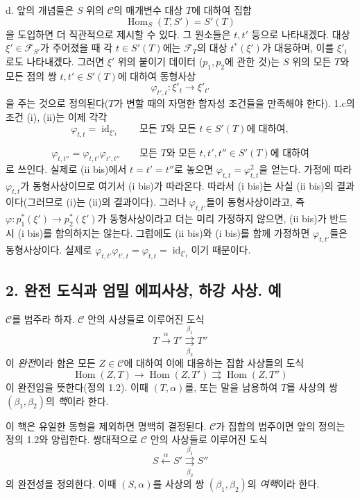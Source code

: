 \medskip\noindent
d. 앞의 개념들은 $S$ 위의 $\mathcal C$의 매개변수 대상 $T$에 대하여
집합
\[
  \operatorname{Hom}_S(T,S')=S'(T)
\]
을 도입하면 더 직관적으로 제시할 수 있다. 그 원소들은 $t,t'$ 등으로
나타내겠다. 대상 $\xi'\in\mathcal F_{S'}$가 주어졌을 때 각
$t\in S'(T)$에는 $\mathcal F_T$의 대상 $t^*(\xi')$가 대응하며, 이를
$\xi'_t$로도 나타내겠다. 그러면 $\xi'$ 위의 붙이기 데이터
($p_1,p_2$에 관한 것)는 $S$ 위의 모든 $T$와 모든 점의 쌍
$t,t'\in S'(T)$에 대하여 동형사상
\[
  \varphi_{t',t}:\xi'_t\longrightarrow\xi'_{t'}
\]
을 주는 것으로 정의된다($T$가 변할 때의 자명한 함자성 조건들을
만족해야 한다). 1.c의 조건 (i), (ii)는 이제 각각
\[
  \tag{i bis}
  \varphi_{t,t}=\operatorname{id}_{\xi'_t}
  \qquad\text{모든 $T$와 모든 $t\in S'(T)$에 대하여},
\]

\[
  \tag{ii bis}
  \varphi_{t,t''}=\varphi_{t,t'}\varphi_{t',t''}
  \qquad\text{모든 $T$와 모든 $t,t',t''\in S'(T)$에 대하여}
\]
로 쓰인다. 실제로 (ii bis)에서 $t=t'=t''$로 놓으면
$\varphi_{t,t}=\varphi_{t,t}^2$을 얻는다. 가정에 따라
$\varphi_{t,t}$가 동형사상이므로 여기서 (i bis)가 따라온다. 따라서
(i bis)는 사실 (ii bis)의 결과이다(그러므로 (i)는 (ii)의 결과이다).
그러나 $\varphi_{t,t'}$들이 동형사상이라고, 즉
$\varphi:p_1^*(\xi')\longrightarrow p_2^*(\xi')$가 동형사상이라고 더는
미리 가정하지 않으면, (ii bis)가 반드시 (i bis)를 함의하지는 않는다.
그럼에도 (ii bis)와 (i bis)를 함께 가정하면 $\varphi_{t,t'}$들은
동형사상이다. 실제로
$\varphi_{t,t'}\varphi_{t',t}=\varphi_{t,t}
=\operatorname{id}_{\xi'_t}$이기 때문이다.

\subsection*{2. 완전 도식과 엄밀 에피사상, 하강 사상. 예}

 $\mathcal C$를 범주라 하자. $\mathcal C$ 안의
사상들로 이루어진 도식
\[
  T\xrightarrow{\alpha}T'
  \overset{\beta_1}{\underset{\beta_2}{\rightrightarrows}}T''
\]
이 \emph{완전}이라 함은 모든 $Z\in\mathcal C$에 대하여 이에 대응하는
집합 사상들의 도식
\[
  \operatorname{Hom}(Z,T)\longrightarrow
  \operatorname{Hom}(Z,T')
  \rightrightarrows\operatorname{Hom}(Z,T'')
\]
이 완전임을 뜻한다(정의 1.2). 이때 $(T,\alpha)$를, 또는 말을
남용하여 $T$를 사상의 쌍 $(\beta_1,\beta_2)$의 \emph{핵}이라 한다.

이 핵은 유일한 동형을 제외하면 명백히 결정된다. $\mathcal C$가
집합의 범주이면 앞의 정의는 정의 1.2와 양립한다. 쌍대적으로
$\mathcal C$ 안의 사상들로 이루어진 도식
\[
  S\xleftarrow{\alpha}S'
  \overset{\beta_1}{\underset{\beta_2}{\rightrightarrows}}S''
\]
의 완전성을 정의한다. 이때 $(S,\alpha)$를 사상의 쌍
$(\beta_1,\beta_2)$의 \emph{여핵}이라 한다.

